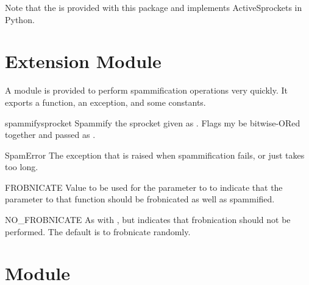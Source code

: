 \documentclass{howto}
\begin{document}
Note that the  is provided with this package and
implements ActiveSprockets in Python.



\section{Extension Module }
\label{module-spamsprock}       %

A \C{} module is provided to perform spammification operations very
quickly.  It exports a function, an exception, and some constants.

\begin{funcdesc}{spammify}{sprocket}
Spammify the sprocket given as .  Flags my be
bitwise-ORed together and passed as .
\end{funcdesc}

\begin{excdesc}{SpamError}
The exception that is raised when spammification fails, or just takes
too long.
\end{excdesc}

\begin{datadesc}{FROBNICATE}
Value to be used for the  parameter to
 to indicate that the  parameter to 
that function should be frobnicated as well as spammified.
\end{datadesc}

\begin{datadesc}{NO_FROBNICATE}
As with , but indicates that frobnication should
not be performed.  The default is to frobnicate randomly.
\end{datadesc}



\section{Module }
\label{module-sprunkit}
\end{document}
